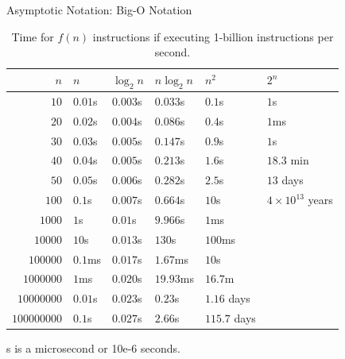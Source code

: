 \documentclass[14pt,aspectratio=1610]{beamer}
\begin{document}
\begin{frame}{Asymptotic Notation: Big-O Notation}
\center\vspace{-0.5em}%
\begin{table}[]
\caption{Time for $f(n)$ instructions if executing 1-billion instructions per second.}\vspace{-0.75em}
{\small%
\begin{tabular}{rlllll}
  \toprule%
$n$ & $n$ & $\log_2{n}$ & $n \log_2{n}$ & $n^2$ & $2^n$ \\
\midrule
$10$         & $0.01$\textmu{}s        & $0.003$\textmu{}s           & $0.033$\textmu{}s             & $0.1$\textmu{}s          & $1$\textmu{}s            \\
$20$         & $0.02$\textmu{}s        & $0.004$\textmu{}s           & $0.086$\textmu{}s             & $0.4$\textmu{}s          & $1$ms                \\
$30$         & $0.03$\textmu{}s        & $0.005$\textmu{}s           & $0.147$\textmu{}s             & $0.9$\textmu{}s          & $1$s                 \\
$40$         & $0.04$\textmu{}s        & $0.005$\textmu{}s           & $0.213$\textmu{}s             & $1.6$\textmu{}s          & $18.3$ min           \\
$50$         & $0.05$\textmu{}s        & $0.006$\textmu{}s           & $0.282$\textmu{}s             & $2.5$\textmu{}s          & $13$ days            \\
$100$        & $0.1$\textmu{}s         & $0.007$\textmu{}s           & $0.664$\textmu{}s             & $10$\textmu{}s           & $4\times10^{13}$ years       \\
$1000$       & $1$\textmu{}s           & $0.01$\textmu{}s            & $9.966$\textmu{}s             & $1$ms                &                    \\
$10000$      & $10$\textmu{}s          & $0.013$\textmu{}s           & $130$\textmu{}s               & $100$ms              &                    \\
$100000$     & $0.1$ms             & $0.017$\textmu{}s           & $1.67$ms                  & $10$s                &                    \\
$1000000$    & $1$ms               & $0.020$\textmu{}s           & $19.93$ms                 & $16.7$m              &                    \\
$10000000$   & $0.01$s             & $0.023$\textmu{}s           & $0.23$s                   & $1.16$ days          &                    \\
$100000000$  & $0.1$s              & $0.027$\textmu{}s           & $2.66$s                   & $115.7$ days\\
\bottomrule%
\end{tabular}}
\end{table}\vspace{-0.5em}
{\footnotesize *\textmu{}s is a microsecond or 10e-6 seconds.}
\end{frame}
\end{document}
